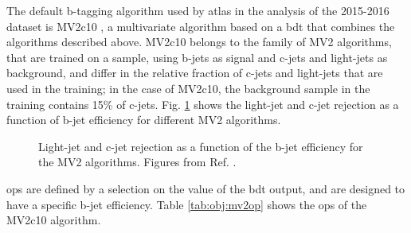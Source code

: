 The default b-tagging algorithm used by \gls{atlas} in the analysis of the 2015-2016 dataset is MV2c10 
\cite{ATL-PHYS-PUB-2015-022,ATL-PHYS-PUB-2016-012}, 
a multivariate algorithm based on a \gls{bdt} that combines the algorithms described above. 
MV2c10 belongs to the family of MV2 algorithms, that are trained on a \ttbar sample, using b-jets as signal and c-jets and light-jets as background, and differ in the relative fraction of c-jets and light-jets that are
used in the training; in the case of MV2c10, the background sample in the training contains 15\% of c-jets.
Fig. \ref{fig:obj:mv2} shows the light-jet and c-jet rejection as a function of b-jet efficiency for different MV2 algorithms.

\begin{figure}[h]
\begin{center}
\end{center}
 \caption{Light-jet  and c-jet  rejection as a function of the b-jet efficiency for the MV2 algorithms. Figures from Ref. \cite{ATL-PHYS-PUB-2016-012}.}
  \label{fig:obj:mv2}
\end{figure}

\glspl{op} are defined by a selection on the value of the \gls{bdt} output, and are designed to have a specific b-jet efficiency.
Table \ref{tab:obj:mv2op} shows the \glspl{op} of the MV2c10 algorithm.

